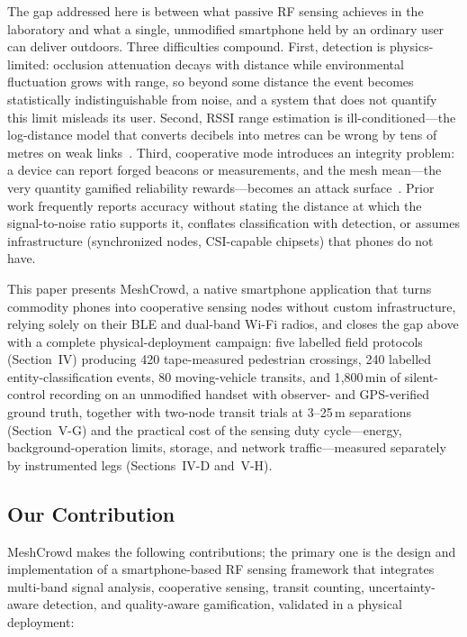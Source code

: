\documentclass[journal,10pt]{IEEEtran}
\begin{document}
The gap addressed here is between what passive RF sensing achieves in the
laboratory and what a single, unmodified smartphone held by an ordinary user
can deliver outdoors. Three difficulties compound. First, detection is
physics-limited: occlusion attenuation decays with distance while
environmental fluctuation grows with range, so beyond some distance the event
becomes statistically indistinguishable from noise, and a system that does
not quantify this limit misleads its user. Second, RSSI range estimation is
ill-conditioned---the log-distance model that converts decibels into metres
can be wrong by tens of metres on weak links~\cite{ramirez2021,milano2024}.
Third, cooperative mode introduces an integrity problem: a device can report
forged beacons or measurements, and the mesh mean---the very quantity
gamified reliability rewards---becomes an attack
surface~\cite{casar2022,antonioli2020}. Prior work frequently reports
accuracy without stating the distance at which the signal-to-noise ratio
supports it, conflates classification with detection, or assumes
infrastructure (synchronized nodes, CSI-capable chipsets) that phones do not
have.

This paper presents MeshCrowd, a native smartphone application that turns
commodity phones into cooperative sensing nodes without custom
infrastructure, relying solely on their BLE and dual-band Wi-Fi radios, and
closes the gap above with a complete physical-deployment campaign: five
labelled field protocols (Section~IV) producing 420 tape-measured pedestrian
crossings, 240 labelled entity-classification events, 80 moving-vehicle
transits, and 1{,}800\,min of silent-control recording on an unmodified
handset with observer- and GPS-verified ground truth, together with two-node
transit trials at 3--25\,m separations (Section~V-G) and the practical cost
of the sensing duty cycle---energy, background-operation limits, storage, and
network traffic---measured separately by instrumented legs
(Sections~IV-D and~V-H).

\subsection{Our Contribution}
MeshCrowd makes the following contributions; the primary one is the
design and implementation of a smartphone-based RF sensing framework that
integrates multi-band signal analysis, cooperative sensing, transit
counting, uncertainty-aware detection, and quality-aware gamification,
validated in a physical deployment:
\end{document}
